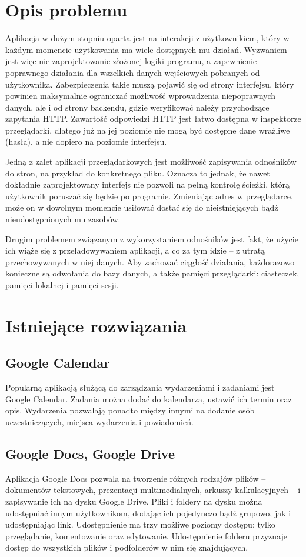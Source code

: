\documentclass[a4paper,twoside,12pt]{book}
\begin{document}
\section{Opis problemu}
Aplikacja w dużym stopniu oparta jest na interakcji z użytkownikiem, który w każdym momencie użytkowania ma wiele dostępnych mu działań. Wyzwaniem jest więc nie zaprojektowanie złożonej logiki programu, a zapewnienie poprawnego działania dla wszelkich danych wejściowych pobranych od użytkownika. Zabezpieczenia takie muszą pojawić się od strony interfejsu, który powinien maksymalnie ograniczać możliwość wprowadzenia niepoprawnych danych, ale i od strony backendu, gdzie weryfikować należy przychodzące zapytania HTTP. Zawartość odpowiedzi HTTP jest łatwo dostępna w inspektorze przeglądarki, dlatego już na jej poziomie nie mogą być dostępne dane wrażliwe (hasła), a nie dopiero na poziomie interfejsu.

Jedną z zalet aplikacji przeglądarkowych jest możliwość zapisywania odnośników do stron, na przykład do konkretnego pliku. Oznacza to jednak, że nawet dokładnie zaprojektowany interfejs nie pozwoli na pełną kontrolę ścieżki, którą użytkownik poruszać się będzie po programie. Zmieniając adres w przeglądarce, może on w dowolnym momencie usiłować dostać się do nieistniejących bądź nieudostępnionych mu zasobów.

Drugim problemem związanym z wykorzystaniem odnośników jest fakt, że użycie ich wiąże się z przeładowywaniem aplikacji, a co za tym idzie -- z utratą przechowywanych w niej danych. Aby zachować ciągłość działania, każdorazowo konieczne są odwołania do bazy danych, a także pamięci przeglądarki: ciasteczek, pamięci lokalnej i pamięci sesji.

\section{Istniejące rozwiązania}
\subsection{Google Calendar}
Popularną aplikacją służącą do zarządzania wydarzeniami i zadaniami jest Google Calendar. Zadania można dodać do kalendarza, ustawić ich termin oraz opis. Wydarzenia pozwalają ponadto między innymi na dodanie osób uczestniczących, miejsca wydarzenia i powiadomień.
\subsection{Google Docs, Google Drive}
Aplikacja Google Docs pozwala na tworzenie różnych rodzajów plików -- dokumentów tekstowych, prezentacji multimedialnych, arkuszy kalkulacyjnych -- i zapisywanie ich na dysku Google Drive. Pliki i foldery na dysku można udostępniać innym użytkownikom, dodając ich pojedynczo bądź grupowo, jak i udostępniając link. Udostępnienie ma trzy możliwe poziomy dostępu: tylko przeglądanie, komentowanie oraz edytowanie. Udostępnienie folderu przyznaje dostęp do wszystkich plików i podfolderów w nim się znajdujących.
\end{document}
